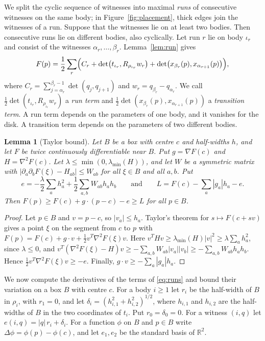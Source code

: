 \documentclass[11pt]{amsart}
\newtheorem{lemma}[theorem]{Lemma}
\theoremstyle{definition}
\theoremstyle{remark}
\numberwithin{equation}{section}
\newcommand{\R}{\mathbb{R}}
\newcommand{\lmin}{\lambda_{\min}}
\begin{document}
We split the cyclic sequence of witnesses into maximal \emph{runs} of consecutive witnesses on the same body; in Figure~\ref{fig:placement}, thick edges join the witnesses of a run. Suppose that the witnesses lie on at least two bodies. Then consecutive runs lie on different bodies, also cyclically. Let run $r$ lie on body $\iota_r$ and consist of the witnesses $\alpha_r,\dots,\beta_r$. Lemma~\ref{lem:run} gives
\begin{equation}\label{eq:runs}
F(p)=\frac12\sum_r\Bigl(C_r+\det\bigl(t_{\iota_r},R_{\rho_{\iota_r}}w_r\bigr)+\det\bigl(x_{\beta_r}(p),x_{\alpha_{r+1}}(p)\bigr)\Bigr),
\end{equation}
where $C_r=\sum_{j=\alpha_r}^{\beta_r-1}\det(q_j,q_{j+1})$ and $w_r=q_{\beta_r}-q_{\alpha_r}$. We call $\frac12\det(t_{\iota_r},R_{\rho_{\iota_r}}w_r)$ a \emph{run term} and $\frac12\det(x_{\beta_r}(p),x_{\alpha_{r+1}}(p))$ a \emph{transition term}. A run term depends on the parameters of one body, and it vanishes for the disk. A transition term depends on the parameters of two different bodies.

\begin{lemma}[Taylor bound]\label{lem:taylor}
Let $B$ be a box with centre $c$ and half-widths $h$, and let $F$ be twice continuously differentiable near $B$. Put $g=\nabla F(c)$ and $H=\nabla^2F(c)$. Let $\lambda\le\min(0,\lmin(H))$, and let $W$ be a symmetric matrix with $|\partial_a\partial_bF(\xi)-H_{ab}|\le W_{ab}$ for all $\xi\in B$ and all $a,b$. Put
\[
e=-\frac\lambda2\sum_ah_a^2+\frac12\sum_{a,b}W_{ab}h_ah_b\qquad\text{and}\qquad L=F(c)-\sum_a|g_a|h_a-e.
\]
Then $F(p)\ge F(c)+g\cdot(p-c)-e\ge L$ for all $p\in B$.
\end{lemma}

\begin{proof}
Let $p\in B$ and $v=p-c$, so $|v_a|\le h_a$. Taylor's theorem for $s\mapsto F(c+sv)$ gives a point $\xi$ on the segment from $c$ to $p$ with $F(p)=F(c)+g\cdot v+\frac12v^T\nabla^2F(\xi)v$. Here $v^THv\ge\lmin(H)|v|^2\ge\lambda\sum_ah_a^2$, since $\lambda\le0$, and $v^T(\nabla^2F(\xi)-H)v\ge-\sum_{a,b}W_{ab}|v_a||v_b|\ge-\sum_{a,b}W_{ab}h_ah_b$. Hence $\frac12v^T\nabla^2F(\xi)v\ge-e$. Finally, $g\cdot v\ge-\sum_a|g_a|h_a$.
\end{proof}

We now compute the derivatives of the terms of \eqref{eq:runs} and bound their variation on a box $B$ with centre $c$. For a body $i\ge1$ let $r_i$ be the half-width of $B$ in $\rho_i$, with $r_1=0$, and let $\delta_i=(h_{i,1}^2+h_{i,2}^2)^{1/2}$, where $h_{i,1}$ and $h_{i,2}$ are the half-widths of $B$ in the two coordinates of $t_i$. Put $r_0=\delta_0=0$. For a witness $(i,q)$ let $e(i,q)=|q|\,r_i+\delta_i$. For a function $\phi$ on $B$ and $p\in B$ write $\Delta\phi=\phi(p)-\phi(c)$, and let $e_1,e_2$ be the standard basis of $\R^2$.
\end{document}
